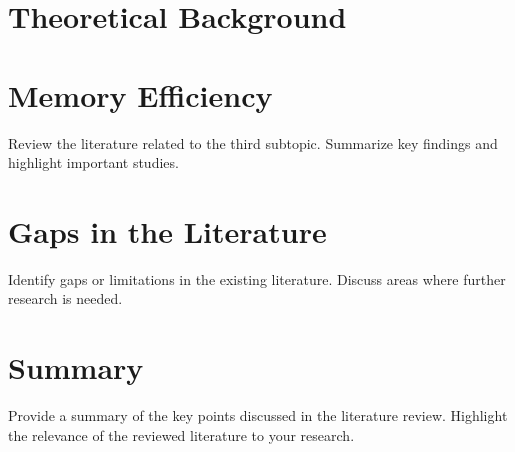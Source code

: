 
\section{Theoretical Background}


\section{Memory Efficiency}
Review the literature related to the third subtopic. Summarize key findings and highlight important studies.

\section{Gaps in the Literature}
Identify gaps or limitations in the existing literature. Discuss areas where further research is needed.

\section{Summary}
Provide a summary of the key points discussed in the literature review. Highlight the relevance of the reviewed literature to your research.
